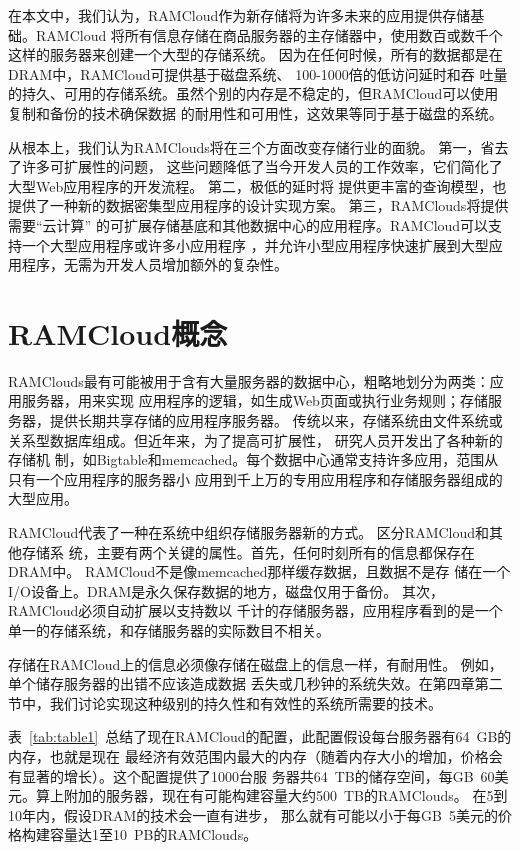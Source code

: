 \documentclass[translation]{zjutreport}
\begin{document}
在本文中，我们认为，RAMCloud作为新存储将为许多未来的应用提供存储基础。RAMCloud
将所有信息存储在商品服务器的主存储器中，使用数百或数千个这样的服务器来创建一个大型的存储系统。
因为在任何时候，所有的数据都是在DRAM中，RAMCloud可提供基于磁盘系统、
100-1000倍的低访问延时和吞
吐量的持久、可用的存储系统。虽然个别的内存是不稳定的，但RAMCloud可以使用复制和备份的技术确保数据
的耐用性和可用性，这效果等同于基于磁盘的系统。

从根本上，我们认为RAMClouds将在三个方面改变存储行业的面貌。
第一，省去了许多可扩展性的问题，
这些问题降低了当今开发人员的工作效率，它们简化了大型Web应用程序的开发流程。
第二，极低的延时将
提供更丰富的查询模型，也提供了一种新的数据密集型应用程序的设计实现方案。
第三，RAMClouds将提供需要“云计算”
的可扩展存储基底和其他数据中心的应用程序\cite{ref:3}。RAMCloud可以支持一个大型应用程序或许多小应用程序
，并允许小型应用程序快速扩展到大型应用程序，无需为开发人员增加额外的复杂性。


\chapter{RAMCloud概念}
RAMClouds最有可能被用于含有大量服务器的数据中心，粗略地划分为两类：应用服务器，用来实现
应用程序的逻辑，如生成Web页面或执行业务规则；存储服务器，提供长期共享存储的应用程序服务器。
传统以来，存储系统由文件系统或关系型数据库组成。但近年来，为了提高可扩展性，
研究人员开发出了各种新的存储机
制，如Bigtable\cite{ref:4}和memcached\cite{ref:16}。每个数据中心通常支持许多应用，范围从只有一个应用程序的服务器小
应用到千上万的专用应用程序和存储服务器组成的大型应用。

RAMCloud代表了一种在系统中组织存储服务器新的方式。
区分RAMCloud和其他存储系
统，主要有两个关键的属性。首先，任何时刻所有的信息都保存在DRAM中。
RAMCloud不是像memcached\cite{ref:16}那样缓存数据，且数据不是存
储在一个I/O设备上。DRAM是永久保存数据的地方，磁盘仅用于备份。
其次，RAMCloud必须自动扩展以支持数以
千计的存储服务器，应用程序看到的是一个单一的存储系统，和存储服务器的实际数目不相关。

存储在RAMCloud上的信息必须像存储在磁盘上的信息一样，有耐用性。
例如，单个储存服务器的出错不应该造成数据
丢失或几秒钟的系统失效。在第四章第二节中，我们讨论实现这种级别的持久性和有效性的系统所需要的技术。

表~\ref{tab:table1}~总结了现在RAMCloud的配置，此配置假设每台服务器有64~GB的内存，也就是现在
最经济有效范围内最大的内存（随着内存大小的增加，价格会有显著的增长）。这个配置提供了1000台服
务器共64~TB的储存空间，每GB~60美元。算上附加的服务器，现在有可能构建容量大约500~TB的RAMClouds。
在5到10年内，假设DRAM的技术会一直有进步，
那么就有可能以小于每GB~5美元的价格构建容量达1至10~PB的RAMClouds。
\end{document}
